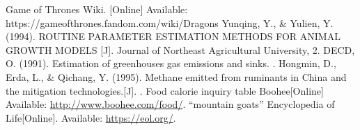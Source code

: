 \begin{thebibliography}{99}
 Game of Thrones Wiki. [Online] Available: https://gameofthrones.fandom.com/wiki/Dragons 
 Yunqing, Y., \& Yulien, Y. (1994). ROUTINE PARAMETER ESTIMATION METHODS FOR ANIMAL GROWTH MODELS [J]. Journal of Northeast Agricultural University, 2.
 DECD, O. (1991). Estimation of greenhouses gas emissions and sinks. .
 Hongmin, D., Erda, L., \& Qichang, Y. (1995). Methane emitted from ruminants in China and the mitigation technologies.[J]. .
 Food calorie inquiry table Boohee[Online] Available: \url{http://www.boohee.com/food/}.
 ``mountain goats'' Encyclopedia of Life[Online].  Available: \url{https://eol.org/}.
\end{thebibliography}